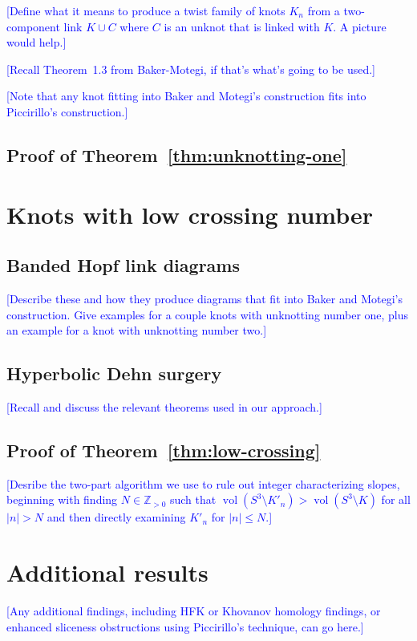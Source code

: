 \documentclass[11pt,usenames,dvipsnames,reqno]{amsart}
\newcommand{\zz}{\mathbb{Z}}
\newcommand{\vol}{\operatorname{vol}}
\numberwithin{theorem}{section}
\theoremstyle{ex}
\theoremstyle{rem}
\def\kh#1{\textcolor{Blue}{#1}}
\begin{document}
\kh{[Define what it means to produce a twist family of knots $K_n$ from a two-component link $K\cup C$ where $C$ is an unknot that is linked with $K$. A picture would help.]}

\kh{[Recall Theorem~1.3 from Baker-Motegi, if that's what's going to be used.]}

\kh{[Note that any knot fitting into Baker and Motegi's construction fits into Piccirillo's construction.]}

\subsection{Proof of Theorem~\ref{thm:unknotting-one}}

\section{Knots with low crossing number}

\subsection{Banded Hopf link diagrams} \kh{[Describe these and how they produce diagrams that fit into Baker and Motegi's construction. Give examples for a couple knots with unknotting number one, plus an example for a knot with unknotting number two.]}


\subsection{Hyperbolic Dehn surgery} \kh{[Recall and discuss the relevant theorems used in our approach.]}

\subsection{Proof of Theorem~\ref{thm:low-crossing}}

\kh{[Desribe the two-part algorithm we use to rule out integer characterizing slopes, beginning with finding $N \in \zz_{>0}$ such that $\vol(S^3 \setminus K'_n)> \vol(S^3 \setminus K)$ for all $|n|>N$ and then directly examining $K'_n$ for $|n| \leq N$.]}

\section{Additional results}

\kh{[Any additional findings, including HFK or Khovanov homology findings, or enhanced sliceness obstructions using Piccirillo's technique, can go here.]}




\end{document}
